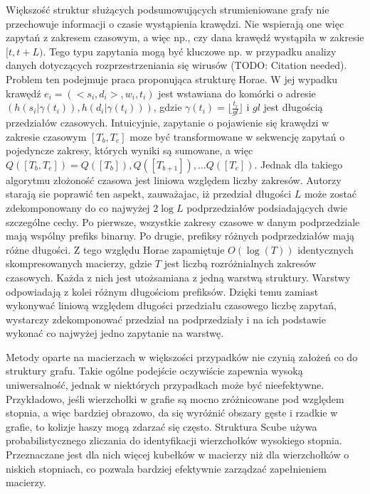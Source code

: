     Większość struktur służących podsumowujących strumieniowane grafy nie przechowuje informacji o czasie wystąpienia krawędzi. Nie wspierają one więc zapytań z zakresem czasowym, a więc np., czy dana krawędź wystąpiła w zakresie $[t, t + L)$. Tego typu zapytania mogą być kluczowe np. w przypadku analizy danych dotyczących rozprzestrzeniania się wirusów (TODO: Citation needed). Problem ten podejmuje praca proponująca strukturę Horae\cite{Chen_Zhou_Chen_Xiao_Jin_Li_2022}. W jej wypadku krawędź $e_i = (<s_i, d_i>, w_i, t_i)$ jest wstawiana do komórki o adresie $(h(s_i | \gamma(t_i)), h(d_i | \gamma(t_i)))$, gdzie $\gamma(t_i) = \lfloor \frac{t_i}{gl} \rfloor$ i $gl$ jest długością przedziałów czasowych. Intuicyjnie, zapytanie o pojawienie się krawędzi w zakresie czasowym $[T_b, T_e]$ moze być transformowane w sekwencję zapytań o pojedyncze zakresy, których wyniki są sumowane, a więc $Q([T_b, T_e]) = Q([T_b]), Q([T_{b+1}]), \dots Q([T_e])$. Jednak dla takiego algorytmu złożoność czasowa jest liniowa względem liczby zakresów. Autorzy starają sie poprawić ten aspekt, zauważajac, iż przedział długości $L$ może zostać zdekomponowany do co najwyżej $2\log{L}$ podprzedziałów podsiadających dwie szczególne cechy. Po pierwsze, wszystkie zakresy czasowe w danym podprzedziale mają wspólny prefiks binarny. Po drugie, prefiksy różnych podprzedziałów mają różne długości. Z tego względu Horae zapamiętuje $O(\log(T))$ identycznych skompresowanych macierzy, gdzie $T$ jest liczbą rozróżnialnych zakresów czasowych. Każda z nich jest utożsamiana z jedną warstwą struktury. Warstwy odpowiadają z kolei różnym długościom prefiksów. Dzięki temu zamiast wykonywać liniową względem długości przedziału czasowego liczbę zapytań, wystarczy zdekomponować przedział na podprzedziały i na ich podstawie wykonać co najwyżej jedno zapytanie na warstwę. 
    
    Metody oparte na macierzach w większości przypadków nie czynią założeń co do struktury grafu. Takie ogólne podejście oczywiście zapewnia wysoką uniwersalność, jednak w niektórych przypadkach może być nieefektywne. Przykładowo, jeśli wierzchołki w grafie są mocno zróżnicowane pod względem stopnia, a więc bardziej obrazowo, da się wyróżnić obszary gęste i rzadkie w grafie, to kolizje haszy mogą zdarzać się często. Struktura Scube\cite{Chen_Zhou_Chen_Jin_2022} używa probabilistycznego zliczania do identyfikacji wierzchołków wysokiego stopnia. Przeznaczane jest dla nich więcej kubełków w macierzy niż dla wierzchołków o niskich stopniach, co pozwala bardziej efektywnie zarządzać zapełnieniem macierzy. 

